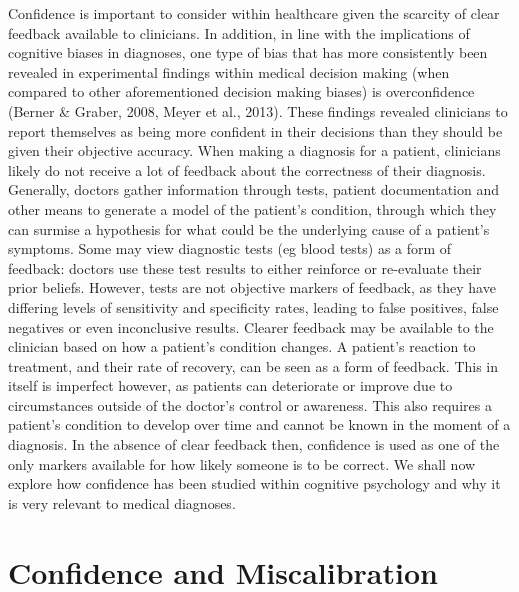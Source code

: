 \documentclass[a4paper, nobind]{templates/ociamthesis}
\begin{document}
\hfill\break
Confidence is important to consider within healthcare given the scarcity of clear feedback available to clinicians. In addition, in line with the implications of cognitive biases in diagnoses, one type of bias that has more consistently been revealed in experimental findings within medical decision making (when compared to other aforementioned decision making biases) is overconfidence (Berner \& Graber, 2008, Meyer et al., 2013). These findings revealed clinicians to report themselves as being more confident in their decisions than they should be given their objective accuracy. When making a diagnosis for a patient, clinicians likely do not receive a lot of feedback about the correctness of their diagnosis. Generally, doctors gather information through tests, patient documentation and other means to generate a model of the patient's condition, through which they can surmise a hypothesis for what could be the underlying cause of a patient's symptoms. Some may view diagnostic tests (eg blood tests) as a form of feedback: doctors use these test results to either reinforce or re-evaluate their prior beliefs. However, tests are not objective markers of feedback, as they have differing levels of sensitivity and specificity rates, leading to false positives, false negatives or even inconclusive results. Clearer feedback may be available to the clinician based on how a patient's condition changes. A patient's reaction to treatment, and their rate of recovery, can be seen as a form of feedback. This in itself is imperfect however, as patients can deteriorate or improve due to circumstances outside of the doctor's control or awareness. This also requires a patient's condition to develop over time and cannot be known in the moment of a diagnosis. In the absence of clear feedback then, confidence is used as one of the only markers available for how likely someone is to be correct. We shall now explore how confidence has been studied within cognitive psychology and why it is very relevant to medical diagnoses.

\section*{Confidence and Miscalibration}\label{confidence-and-miscalibration}
\end{document}

